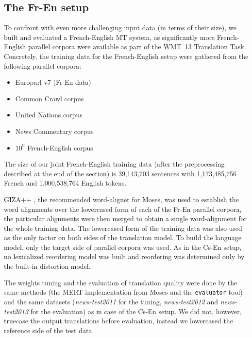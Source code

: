 \subsection{The Fr-En setup}

To confront \eppex{} with even more challenging input data (in terms of their size),
we built and evaluated a French-English MT system, as significantly more French-English parallel
corpora were available as part of the WMT~13 Translation Task. Concretely, the training data for
the French-English setup were gathered from the following parallel corpora:
\begin{itemize}
  \item Europarl v7 (Fr-En data)
  \item Common Crawl corpus
  \item United Nations corpus
  \item News Commentary corpus
  \item $10^9$ French-English corpus
\end{itemize}
The size of our joint French-English training data (after the preprocessing described
at the end of the section) is 39,143,703 sentences with 1,173,485,756 French and 1,000,538,764
English tokens.

GIZA++ \citep{och:giza}, the recommended word-aligner for Moses,
was used to establish the word alignments over the lowercased form of each
of the Fr-En parallel corpora, the particular alignments were then merged to
obtain a single word-alignment for the whole training data.
The lowercased form of the training data was also used as the only factor on both sides of
the translation model.
To build the language model, only the target side of parallel corpora was used.
As in the Cs-En setup, no lexicalized reordering model was built and reordering was
determined only by the built-in distortion model.

The weights tuning and the evaluation of translation quality were done by the same methods
(the MERT implementation from Moses and the \texttt{evaluator} tool) and the same datasets
(\emph{news-test2011} for the tuning, \emph{news-test2012} and \emph{news-test2013} for
the evaluation) as in case of the Cs-En setup. We did not, however, truecase the
output translations before evaluation, instead we lowercased the reference side of the test data.

